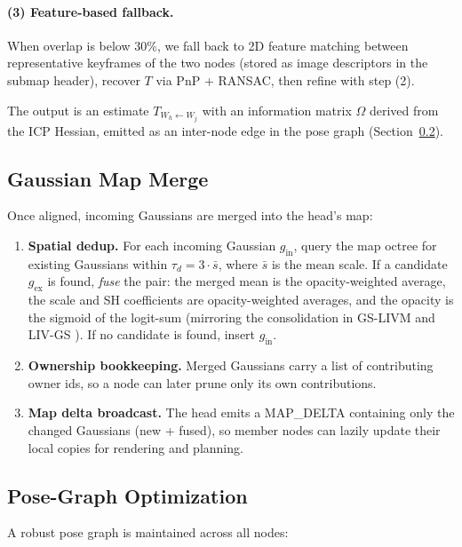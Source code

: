 \paragraph{(3) Feature-based fallback.} When overlap is below 30\%, we fall
back to 2D feature matching between representative keyframes of the two nodes
(stored as image descriptors in the submap header), recover $T$ via PnP +
RANSAC, then refine with step (2).

The output is an estimate $T_{W_h \leftarrow W_j}$ with an information matrix
$\Omega$ derived from the ICP Hessian, emitted as an inter-node edge in the
pose graph (Section~\ref{sec:pgo}).

\subsection{Gaussian Map Merge}
\label{sec:merge}

Once aligned, incoming Gaussians are merged into the head's map:

\begin{enumerate}
  \item \textbf{Spatial dedup.} For each incoming Gaussian $g_{\text{in}}$,
    query the map octree for existing Gaussians within
    $\tau_d = 3 \cdot \bar{s}$, where $\bar{s}$ is the mean scale. If a
    candidate $g_{\text{ex}}$ is found, \emph{fuse} the pair: the merged mean
    is the opacity-weighted average, the scale and SH coefficients are
    opacity-weighted averages, and the opacity is the sigmoid of the
    logit-sum (mirroring the consolidation in GS-LIVM
    \cite{xie2025gslivm} and LIV-GS \cite{xiao2025livgs}). If no candidate is
    found, insert $g_{\text{in}}$.
  \item \textbf{Ownership bookkeeping.} Merged Gaussians carry a list of
    contributing $\text{owner}$ ids, so a node can later prune only its own
    contributions.
  \item \textbf{Map delta broadcast.} The head emits a MAP\_DELTA containing
    only the changed Gaussians (new + fused), so member nodes can lazily
    update their local copies for rendering and planning.
\end{enumerate}

\subsection{Pose-Graph Optimization}
\label{sec:pgo}

A robust pose graph is maintained across all nodes:

